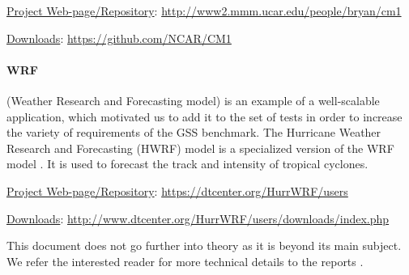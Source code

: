 \iffalse
CM1 is also designed for distributed-memory computing systems. In CM1 there are three models of parallelization. Shared memory parallelization with OpenMP, distributed memory using MPI and mix of both of them - hybrid OpenMP/MPI.
\fi

\underline{Project Web-page/Repository}: \url{http://www2.mmm.ucar.edu/people/bryan/cm1}

\underline{Downloads}: \url{https://github.com/NCAR/CM1}

\iffalse
\underline{Use case description}

CM1 use case contains the following steps: CM1 software download and unpack  \cite{CM1DATA}, compilation and build. When successfully compiled, a \textit{cm1.exe} binary file is created under \textit{cm1r19/run} directory. \textit{cm1r19/ run/ namelist.input} configuration file was used with appropriate \textit{nodex, nodey} and \textit{ppnode} values to let the simulation start on the given number of processors (NP). The simulation is started by calling mpirun: \textit{mpirun -np \$NP ./cm1.exe}
\fi

\paragraph{WRF} (Weather Research and Forecasting model) is an example of a well-scalable application,
which motivated us to add it to the set of tests in order to increase the variety of requirements of the {GSS benchmark}. 
The Hurricane Weather Research and Forecasting (HWRF) model is a specialized version of the WRF model \cite{2018:hwrf}.
It is used to forecast the track and intensity of tropical cyclones.

\underline{Project Web-page/Repository}: \url{https://dtcenter.org/HurrWRF/users}

\underline{Downloads}: \url{http://www.dtcenter.org/HurrWRF/users/downloads/index.php}

\iffalse
\underline{Hurricane WRF software}

\fi


This document does not go further into theory as it is beyond its main subject.
We refer the interested reader for more technical details to the reports \cite{2017:coegss_benchmark1,2018:coegss_benchmark2}.
